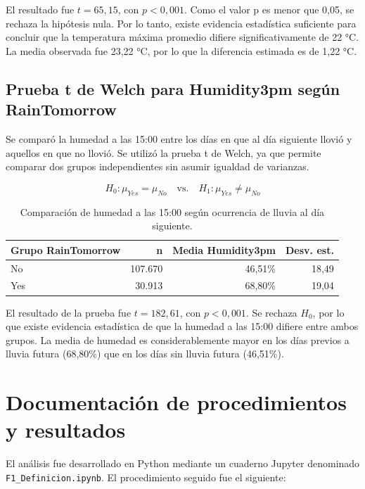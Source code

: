 \documentclass[11pt,a4paper]{article}
\begin{document}
El resultado fue \(t = 65{,}15\), con \(p < 0{,}001\). Como el valor p es menor que 0,05, se rechaza la hipótesis nula. Por lo tanto, existe evidencia estadística suficiente para concluir que la temperatura máxima promedio difiere significativamente de 22 °C. La media observada fue 23,22 °C, por lo que la diferencia estimada es de 1,22 °C.

\subsection{Prueba t de Welch para Humidity3pm según RainTomorrow}

Se comparó la humedad a las 15:00 entre los días en que al día siguiente llovió y aquellos en que no llovió. Se utilizó la prueba t de Welch, ya que permite comparar dos grupos independientes sin asumir igualdad de varianzas.

\[
H_0: \mu_{Yes} = \mu_{No} \quad \text{vs.} \quad H_1: \mu_{Yes} \neq \mu_{No}
\]

\begin{table}[htbp]
\centering
\small
\begin{tabular}{lrrr}
\toprule
Grupo RainTomorrow & n & Media Humidity3pm & Desv. est. \\
\midrule
No & 107.670 & 46,51\% & 18,49 \\
Yes & 30.913 & 68,80\% & 19,04 \\
\bottomrule
\end{tabular}
\caption{Comparación de humedad a las 15:00 según ocurrencia de lluvia al día siguiente.}
\label{tab:welch}
\end{table}

El resultado de la prueba fue \(t = 182{,}61\), con \(p < 0{,}001\). Se rechaza \(H_0\), por lo que existe evidencia estadística de que la humedad a las 15:00 difiere entre ambos grupos. La media de humedad es considerablemente mayor en los días previos a lluvia futura (68,80\%) que en los días sin lluvia futura (46,51\%).

\section{Documentación de procedimientos y resultados}

El análisis fue desarrollado en Python mediante un cuaderno Jupyter denominado \texttt{F1\_Definicion.ipynb}. El procedimiento seguido fue el siguiente:
\end{document}
